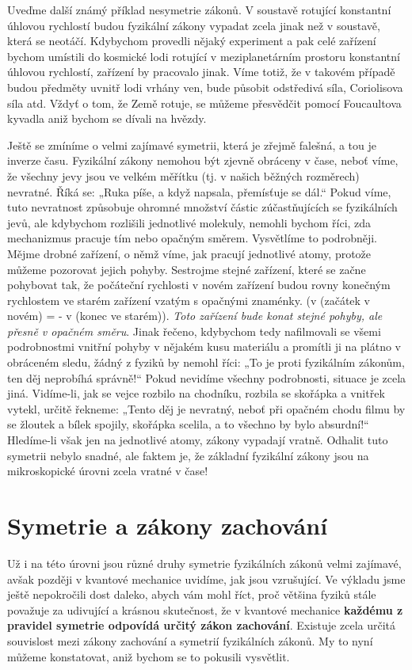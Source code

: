     Uveďme další známý příklad nesymetrie zákonů. V soustavě rotující konstantní úhlovou rychlostí
    budou fyzikální zákony vypadat zcela jinak než v soustavě, která se neotáčí. Kdybychom provedli
    nějaký experiment a pak celé zařízení bychom umístili do kosmické lodi rotující v
    meziplanetárním prostoru konstantní úhlovou rychlostí, zařízení by pracovalo jinak. Víme totiž,
    že v takovém případě budou předměty uvnitř lodi vrhány ven, bude působit odstředivá síla,
    Coriolisova síla atd. Vždyť o tom, že Země rotuje, se můžeme přesvědčit pomocí Foucaultova
    kyvadla aniž bychom se dívali na hvězdy.

    Ještě se zmíníme o velmi zajímavé symetrii, která je zřejmě falešná, a tou je inverze času.
    Fyzikální zákony nemohou být zjevně obráceny v čase, neboť víme, že všechny jevy jsou ve velkém
    měřítku (tj. v našich běžných rozměrech) nevratné. Říká se: „Ruka píše, a když napsala,
    přemísťuje se dál.“ Pokud víme, tuto nevratnost způsobuje ohromné množství částic zúčastňujících
    se fyzikálních jevů, ale kdybychom rozlišili jednotlivé molekuly, nemohli bychom říci, zda
    mechanizmus pracuje tím nebo opačným směrem. Vysvětlíme to podrobněji. Mějme drobné zařízení, o
    němž víme, jak pracují jednotlivé atomy, protože můžeme pozorovat jejich pohyby. Sestrojme
    stejné zařízení, které se začne pohybovat tak, že počáteční rychlosti v novém zařízení budou
    rovny konečným rychlostem ve starém zařízení vzatým s opačnými znaménky. (v (začátek v novém) =
    - v (konec ve starém)). \emph{Toto zařízení bude konat stejné pohyby, ale přesně v opačném
    směru}. Jinak řečeno, kdybychom tedy naﬁlmovali se všemi podrobnostmi vnitřní pohyby v nějakém
    kusu materiálu a promítli ji na plátno v obráceném sledu, žádný z fyziků by nemohl říci: „To je
    proti fyzikálním zákonům, ten děj neprobíhá správně!“ Pokud nevidíme všechny podrobnosti,
    situace je zcela jiná. Vidíme-li, jak se vejce rozbilo na chodníku, rozbila se skořápka a
    vnitřek vytekl, určitě řekneme: „Tento děj je nevratný, neboť při opačném chodu ﬁlmu by se
    žloutek a bílek spojily, skořápka scelila, a to všechno by bylo absurdní!“ Hledíme-li však jen
    na jednotlivé atomy, zákony vypadají vratně. Odhalit tuto symetrii nebylo snadné, ale faktem je,
    že základní fyzikální zákony jsou na mikroskopické úrovni zcela vratné v čase!
  
  \section{Symetrie a zákony zachování}\label{fyz:IchapLIIsecIII}
    Už i na této úrovni jsou různé druhy symetrie fyzikálních zákonů velmi zajímavé, avšak později v
    kvantové mechanice uvidíme, jak jsou vzrušující. Ve výkladu jsme ještě nepokročili dost daleko,
    abych vám mohl říct, proč většina fyziků stále považuje za udivující a krásnou skutečnost, že v
    kvantové mechanice \textbf{každému z pravidel symetrie odpovídá určitý zákon zachování}.
    Existuje zcela určitá souvislost mezi zákony zachování a symetrií fyzikálních zákonů. My to nyní
    můžeme konstatovat, aniž bychom se to pokusili vysvětlit.
    
